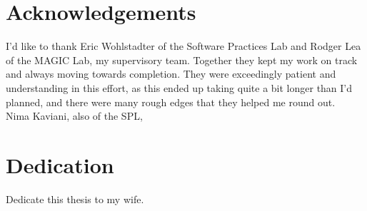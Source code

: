 \documentclass[msc,oneside]{ubcthesis}
\begin{document}
\tableofcontents                %
\listoftables                   %
\listoffigures                  %

\chapter{Acknowledgements}      %

I'd like to thank Eric Wohlstadter of the Software Practices Lab and Rodger Lea of the MAGIC Lab, my supervisory team. Together they kept my work on track and always moving towards completion. They were exceedingly patient and understanding in this effort, as this ended up taking quite a bit longer than I'd planned, and there were many rough edges that they helped me round out.\\

Nima Kaviani, also of the SPL, 

\chapter{Dedication} %
Dedicate this thesis to my wife.


\mainmatter

%	
%
%
\end{document}
